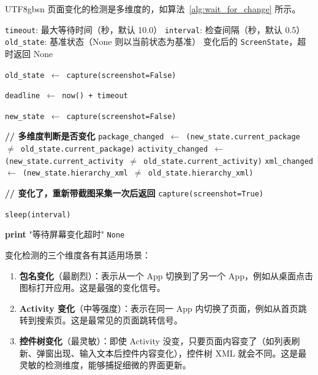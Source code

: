 \documentclass{article}
\begin{document}
\begin{CJK}{UTF8}{gbsn}
页面变化的检测是多维度的，如算法~\ref{alg:wait_for_change} 所示。

\begin{algorithm}[h]
  \caption{\texttt{ScreenCaptor.wait\_for\_change()} 算法}
  \label{alg:wait_for_change}
  \begin{algorithmic}[1]
    \REQUIRE \texttt{timeout}: 最大等待时间（秒，默认 10.0）
    \REQUIRE \texttt{interval}: 检查间隔（秒，默认 0.5）
    \REQUIRE \texttt{old\_state}: 基准状态（None 则以当前状态为基准）
    \ENSURE 变化后的 \texttt{ScreenState}，超时返回 None

      \STATE \texttt{old\_state $\leftarrow$ capture(screenshot=False)}
    \ENDIF

    \STATE \texttt{deadline $\leftarrow$ now() + timeout}

      \STATE \texttt{new\_state $\leftarrow$ capture(screenshot=False)}

      \STATE \textbf{// 多维度判断是否变化}
      \STATE \texttt{package\_changed $\leftarrow$ (new\_state.current\_package $\neq$ old\_state.current\_package)}
      \STATE \texttt{activity\_changed $\leftarrow$ (new\_state.current\_activity $\neq$ old\_state.current\_activity)}
      \STATE \texttt{xml\_changed $\leftarrow$ (new\_state.hierarchy\_xml $\neq$ old\_state.hierarchy\_xml)}

        \STATE \textbf{// 变化了，重新带截图采集一次后返回}
        \RETURN \texttt{capture(screenshot=True)}
      \ENDIF

      \STATE \texttt{sleep(interval)}
    \ENDWHILE

    \STATE \textbf{print} "等待屏幕变化超时"
    \RETURN \texttt{None}
  \end{algorithmic}
\end{algorithm}

变化检测的三个维度各有其适用场景：

\begin{enumerate}[leftmargin=1.5em]
  \item \textbf{包名变化}（最剧烈）：表示从一个 App 切换到了另一个 App，例如从桌面点击图标打开应用。这是最强的变化信号。
  \item \textbf{Activity 变化}（中等强度）：表示在同一 App 内切换了页面，例如从首页跳转到搜索页。这是最常见的页面跳转信号。
  \item \textbf{控件树变化}（最灵敏）：即使 Activity 没变，只要页面内容变了（如列表刷新、弹窗出现、输入文本后控件内容变化），控件树 XML 就会不同。这是最灵敏的检测维度，能够捕捉细微的界面更新。
\end{enumerate}


\end{CJK}
\end{document}
